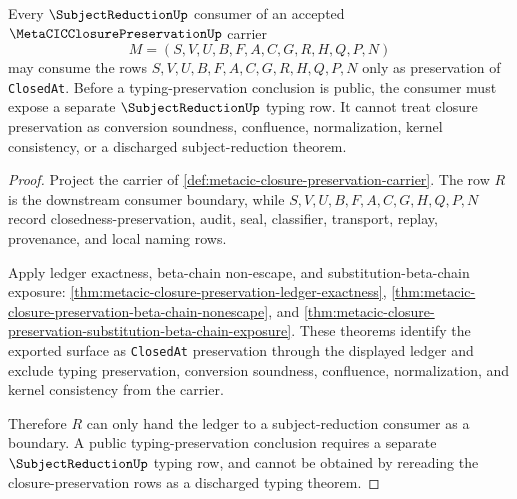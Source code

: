\begin{theorem}
\label{thm:metacic-closure-preservation-subject-reduction-boundary}
Every $\SubjectReductionUp$ consumer of an accepted $\MetaCICClosurePreservationUp$ carrier
$$
M=(S,V,U,B,F,A,C,G,R,H,Q,P,N)
$$
may consume the rows $S,V,U,B,F,A,C,G,R,H,Q,P,N$ only as preservation of \texttt{ClosedAt}. Before a typing-preservation conclusion is public, the consumer must expose a separate $\SubjectReductionUp$ typing row. It cannot treat closure preservation as conversion soundness, confluence, normalization, kernel consistency, or a discharged subject-reduction theorem.
\end{theorem}
\begin{proof}
Project the carrier of \autoref{def:metacic-closure-preservation-carrier}. The row $R$ is the downstream consumer boundary, while $S,V,U,B,F,A,C,G,H,Q,P,N$ record closedness-preservation, audit, seal, classifier, transport, replay, provenance, and local naming rows.

Apply ledger exactness, beta-chain non-escape, and substitution-beta-chain exposure:
\autoref{thm:metacic-closure-preservation-ledger-exactness},
\autoref{thm:metacic-closure-preservation-beta-chain-nonescape}, and
\autoref{thm:metacic-closure-preservation-substitution-beta-chain-exposure}.
These theorems identify the exported surface as \texttt{ClosedAt} preservation through the displayed ledger and exclude typing preservation, conversion soundness, confluence, normalization, and kernel consistency from the carrier.

Therefore $R$ can only hand the ledger to a subject-reduction consumer as a boundary. A public typing-preservation conclusion requires a separate $\SubjectReductionUp$ typing row, and cannot be obtained by rereading the closure-preservation rows as a discharged typing theorem.
\end{proof}

